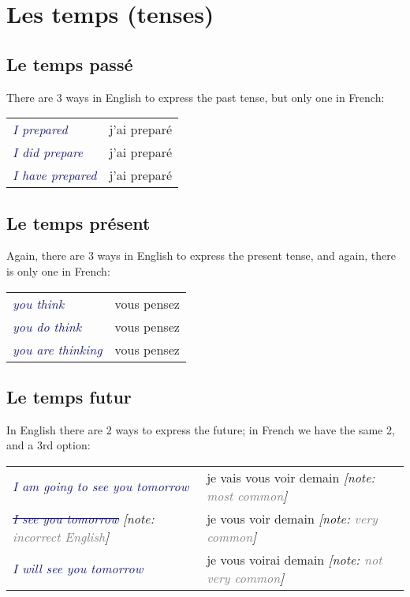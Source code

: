 \documentclass{microdoc} %
\newcommand\lEng[1]{\textcolor{MidnightBlue}{{\it #1}}}
\newcommand\lNote[1]{{\it[note: \textcolor{Gray}{#1}]}}
\begin{document}
\section{Les temps (tenses)} %
\subsection{Le temps passé}
There are 3 ways in English to express the past tense, but only one in French:
\begin{table}[H]
    \begin{tabular}{l l}
        \lEng{I prepared}       & j'ai preparé\\
        \lEng{I did prepare}    & j'ai preparé\\
        \lEng{I have prepared}  & j'ai preparé\\
    \end{tabular}
\end{table}

\subsection{Le temps présent}
Again, there are 3 ways in English to express the present tense, and again,
there is only one in French:
\begin{table}[H]
    \begin{tabular}{l l}
        \lEng{you think}        & vous pensez\\
        \lEng{you do think}     & vous pensez\\
        \lEng{you are thinking} & vous pensez\\
    \end{tabular}
\end{table}

\subsection{Le temps futur}
In English there are 2 ways to express the future; in French we have the
same 2, and a 3rd option:

\begin{table}[H]
    \begin{tabular}{l l}
        \lEng{I am going to see you tomorrow}                    & je vais vous voir demain \lNote{most common}\\
        \lEng{\st{I see you tomorrow}} \lNote{incorrect English} & je vous voir demain \lNote{very common}\\
        \lEng{I will see you tomorrow}                           & je vous voirai demain \lNote{not very common}\\
    \end{tabular}
\end{table}
\end{document}

